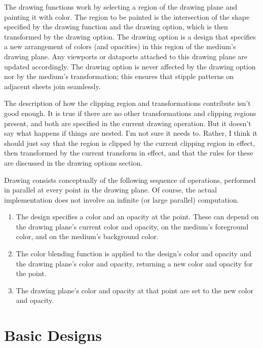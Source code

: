 The drawing functions work by selecting a region of the drawing plane and
painting it with color.  The region to be painted is the intersection of the
shape specified by the drawing function and the  drawing
option, which is then transformed by the  drawing option.
The  drawing option is a design that specifies a new arrangement of
colors (and opacities) in this region of the medium's drawing plane.  Any
viewports or dataports attached to this drawing plane are updated accordingly.
The  drawing option is never affected by the 
drawing option nor by the medium's transformation; this ensures that stipple
patterns on adjacent sheets join seamlessly.

 {The description of how the clipping region and transformations
contribute isn't good enough.  It is true if there are no other transformations
and clipping regions present, and both are specified in the current drawing
operation.  But it doesn't say what happens if things are nested.  I'm not sure
it needs to.  Rather, I think it should just say that the region is clipped
by the current clipping region in effect, then transformed by the current
transform in effect, and that the rules for these are discussed in the drawing
options section.}

Drawing consists conceptually of the following sequence of operations, performed
in parallel at every point in the drawing plane.  Of course, the actual
implementation does not involve an infinite (or large parallel) computation.

\begin{enumerate}
\item The design specifies a color and an opacity at the point.  These can
depend on the drawing plane's current color and opacity, on the medium's
foreground color, and on the medium's background color.

\item The color blending function is applied to the design's color and opacity
and the drawing plane's color and opacity, returning a new color and opacity for
the point.

\item The drawing plane's color and opacity at that point are set to the new
color and opacity.
\end{enumerate}

\section {Basic Designs}

